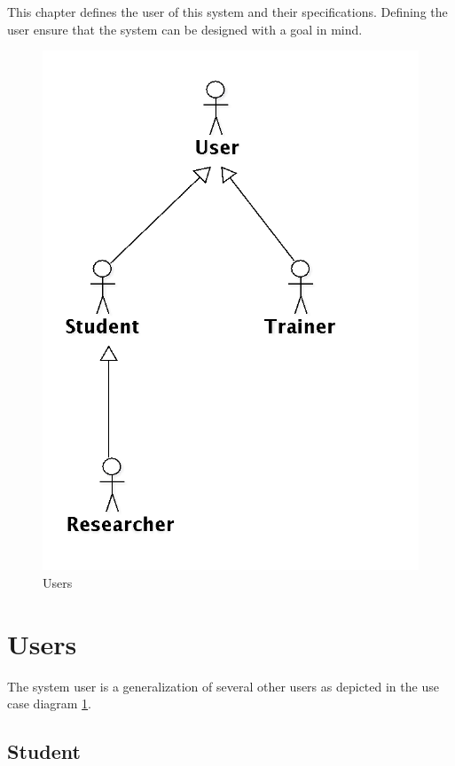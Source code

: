 \documentclass[11pt]{report}
\begin{document}
This chapter defines the user of this system and their specifications. Defining the user ensure that the system can be designed with a  goal in mind. 

\begin{figure}[htp]
\centering
\includegraphics[scale=0.25]{images/UserOverview.png}
\caption{Users}
\label{fig:uo}
\end{figure}

\section{Users} 

The system user is a generalization of several other users as depicted in the use case diagram \ref{fig:uo}.  

\subsection{Student}
\end{document}
